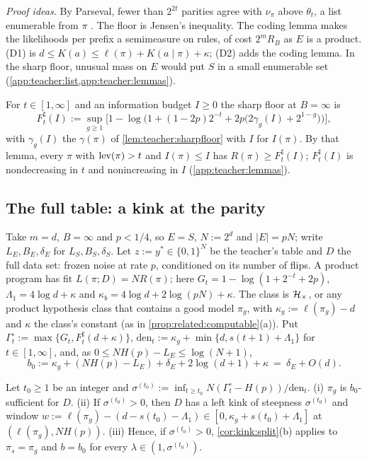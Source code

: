 \emph{Proof ideas.} By Parseval, fewer than $2^{2t}$ parities agree with $\nu_\pi$ above $\theta_t$, a list enumerable from $\pi$ \citep{goldreich1989hard,kushilevitz1993learning}. The floor is Jensen's inequality. The coding lemma makes the likelihoods per prefix a semimeasure on rules, of cost $2^mR_B$ as $E$ is a product. (D1) is $d\le K(a)\le\ell(\pi)+K(a\mid\pi)+\kappa$; (D2) adds the coding lemma. In the sharp floor, unusual mass on $E$ would put $S$ in a small enumerable set \citep{hoeffding1963probability} (\cref{app:teacher:list,app:teacher:lemmas}).

For $t\in[1,\infty]$ and an information budget $I\ge0$ the sharp floor at $B=\infty$ is
\[
F^\sharp_t(I):=\sup_{g\ge1}\Big[1-\log\Big(1+(1-2p)2^{-t}+2p\big(2\gamma_g(I)+2^{1-g}\big)\Big)\Big],
\]
with $\gamma_g(I)$ the $\gamma(\pi)$ of \cref{lem:teacher:sharpfloor} with $I$ for $I(\pi)$. By that lemma, every $\pi$ with $\operatorname{lev}(\pi)>t$ and $I(\pi)\le I$ has $R(\pi)\ge F^\sharp_t(I)$; $F^\sharp_t(I)$ is nondecreasing in $t$ and nonincreasing in $I$ (\cref{app:teacher:lemmas}).

\subsection{The full table: a kink at the parity}\label{sec:parity:full}\label{sec:algstat:parity}

Take $m=d$, $B=\infty$ and $p<1/4$, so $E=S$, $N:=2^d$ and $|E|=pN$; write $L_E,B_E,\delta_E$ for $L_S,B_S,\delta_S$. Let $z:=y^*\in\{0,1\}^N$ be the teacher's table and $D$ the full data set: frozen noise at rate $p$, conditioned on its number of flips. A product program has fit $L(\pi;D)=NR(\pi)$; here $G_t=1-\log(1+2^{-t}+2p)$, $\Lambda_1=4\log d+\kappa$ and $\kappa_b=4\log d+2\log(pN)+\kappa$. The class is $\mathcal{H}_{\times}$, or any product hypothesis class that contains a good model $\pi_g$, with $\kappa_g:=\ell(\pi_g)-d$ and $\kappa$ the class's constant (as in \cref{prop:related:computable}(a)). Put $\Gamma^\circ_t:=\max\{G_t,F^\sharp_t(d+\kappa)\}$, $\mathrm{den}_t:=\kappa_g+\min\{d,s(t+1)+\Lambda_1\}$ for $t\in[1,\infty]$, and, as $0\le NH(p)-L_E\le\log(N+1)$,
\[
b_0:=\kappa_g+(NH(p)-L_E)+\delta_E+2\log(d+1)+\kappa\ =\ \delta_E+O(d).
\]

\begin{proposition}\label{prop:parity:kink}
Let $t_0\ge1$ be an integer and $\sigma^{(t_0)}:=\inf_{t\ge t_0}N(\Gamma^\circ_t-H(p))/\mathrm{den}_t$.
(i) $\pi_g$ is $b_0$-sufficient for $D$.
(ii) If $\sigma^{(t_0)}>0$, then $D$ has a left kink of steepness $\sigma^{(t_0)}$ and window $w:=\ell(\pi_g)-(d-s(t_0)-\Lambda_1)\in[0,\kappa_g+s(t_0)+\Lambda_1]$ at $(\ell(\pi_g),NH(p))$.
(iii) Hence, if $\sigma^{(t_0)}>0$, \cref{cor:kink:split}(b) applies to $\pi_s=\pi_g$ and $b=b_0$ for every $\lambda\in(1,\sigma^{(t_0)})$.
\end{proposition}

